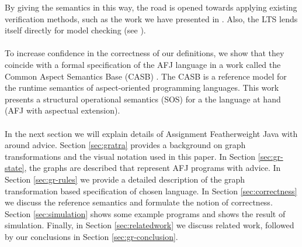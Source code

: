 By giving the semantics in this way, the road is opened towards applying existing verification methods, such as the work we have presented in \cite{Staijen+2009}. Also, the LTS lends itself directly for model checking (see \cite{KastenbergRen2006}).\\
\\
To increase confidence in the correctness of our definitions, we show that they coincide with a formal specification of the AFJ language in a work called the Common Aspect Semantics Base (CASB) \cite{DDFL-NoE06}. The CASB is a reference model for the runtime semantics of aspect-oriented programming languages.  This work presents a structural operational semantics (SOS) for a the language at hand (AFJ with aspectual extension).\\
\\
In the next section we will explain details of Assignment Featherweight Java with around advice.
Section \ref{sec:gratra} provides a background on graph transformations and the visual notation used in this paper.
In Section \ref{sec:gr-state}, the graphs are described that represent AFJ programs with advice.
In Section \ref{sec:gr-rules} we provide a detailed description of the graph transformation based specification of chosen language. 
In Section \ref{sec:correctness} we discuss the reference semantics and formulate the notion of correctness.
Section \ref{sec:simulation} shows some example programs and shows the result of simulation.
Finally, in Section \ref{sec:relatedwork} we discuss related work, followed by our conclusions in Section \ref{sec:gr-conclusion}.
